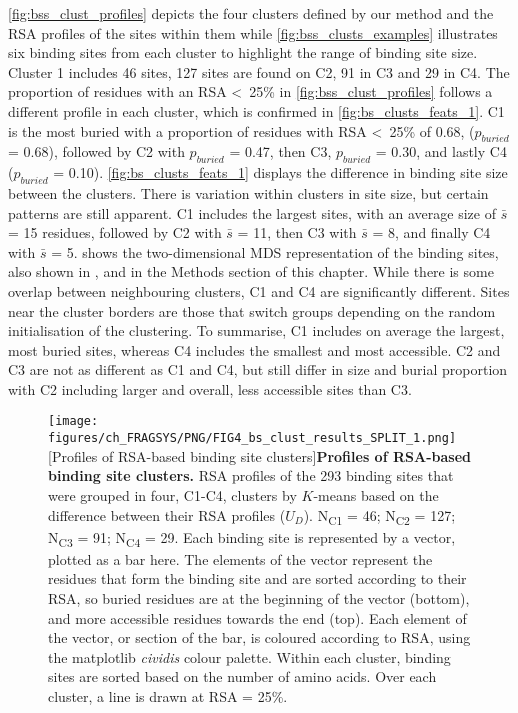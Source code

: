 \autoref{fig:bss_clust_profiles} depicts the four clusters defined by our method and the RSA profiles of the sites within them while \autoref{fig:bss_clusts_examples} illustrates six binding sites from each cluster to highlight the range of binding site size. Cluster 1 includes 46 sites, 127 sites are found on C2, 91 in C3 and 29 in C4. The proportion of residues with an RSA \textless~25\% in \autoref{fig:bss_clust_profiles} follows a different profile in each cluster, which is confirmed in \autoref{fig:bs_clusts_feats_1}. C1 is the most buried with a proportion of residues with RSA \textless~25\% of 0.68, ($p_{buried}$ = 0.68), followed by C2 with $p_{buried}$ = 0.47, then C3, $p_{buried}$ = 0.30, and lastly C4 ($p_{buried}$ = 0.10). \autoref{fig:bs_clusts_feats_1} displays the difference in binding site size between the clusters. There is variation within clusters in site size, but certain patterns are still apparent. C1 includes the largest sites, with an average size of $\bar{s}$ = 15 residues, followed by C2 with $\bar{s}$ = 11, then C3 with $\bar{s}$ = 8, and finally C4 with $\bar{s}$ = 5.  shows the two-dimensional MDS representation of the binding sites, also shown in , and  in the Methods section of this chapter. While there is some overlap between neighbouring clusters, C1 and C4 are significantly different. Sites near the cluster borders are those that switch groups depending on the random initialisation of the clustering. To summarise, C1 includes on average the largest, most buried sites, whereas C4 includes the smallest and most accessible. C2 and C3 are not as different as C1 and C4, but still differ in size and burial proportion with C2 including larger and overall, less accessible sites than C3.

\begin{figure}[hb!]
    \centering
    \texttt{[image: figures/ch\_FRAGSYS/PNG/FIG4\_bs\_clust\_results\_SPLIT\_1.png]}
    [Profiles of RSA-based binding site clusters]{\textbf{Profiles of RSA-based binding site clusters.} RSA profiles of the 293 binding sites that were grouped in four, C1-C4, clusters by $K$-means based on the difference between their RSA profiles ($U_{D}$). N\textsubscript{C1} = 46; N\textsubscript{C2} = 127; N\textsubscript{C3} = 91; N\textsubscript{C4} = 29. Each binding site is represented by a vector, plotted as a bar here. The elements of the vector represent the residues that form the binding site and are sorted according to their RSA, so buried residues are at the beginning of the vector (bottom), and more accessible residues towards the end (top). Each element of the vector, or section of the bar, is coloured according to RSA, using the matplotlib  \textit{cividis} colour palette. Within each cluster, binding sites are sorted based on the number of amino acids. Over each cluster, a line is drawn at RSA = 25\%.}
\label{fig:bss_clust_profiles}
\end{figure}

